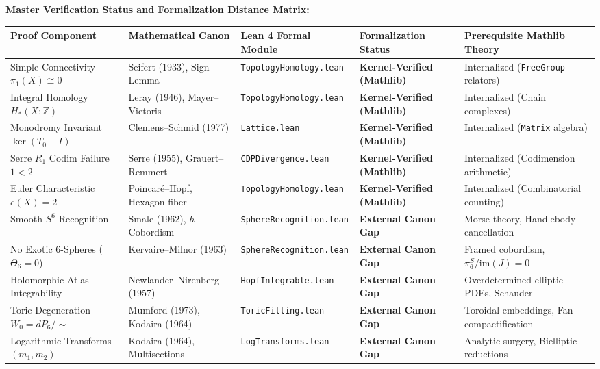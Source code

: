 \documentclass[10pt]{article}
\newcommand{\dbZ}{\mathbb{Z}}
\begin{document}
\vspace{0.4em}
\noindent\textbf{Master Verification Status and Formalization Distance Matrix:}
\begin{center}
\small
\begin{tabular*}{\textwidth}{@{\extracolsep{\fill}}lllll@{}}
\toprule
\textbf{Proof Component} & \textbf{Mathematical Canon} & \textbf{Lean 4 Formal Module} & \textbf{Formalization Status} & \textbf{Prerequisite Mathlib Theory} \\
\midrule
Simple Connectivity $\pi_1(X) \cong 0$ & Seifert (1933), Sign Lemma & \texttt{TopologyHomology.lean} & \textbf{Kernel-Verified (Mathlib)} & Internalized (\texttt{FreeGroup} relators) \\
Integral Homology $H_*(X;\dbZ)$ & Leray (1946), Mayer--Vietoris & \texttt{TopologyHomology.lean} & \textbf{Kernel-Verified (Mathlib)} & Internalized (Chain complexes) \\
Monodromy Invariant $\ker(T_0 - I)$ & Clemens--Schmid (1977) & \texttt{Lattice.lean} & \textbf{Kernel-Verified (Mathlib)} & Internalized (\texttt{Matrix} algebra) \\
Serre $R_1$ Codim Failure $1 < 2$ & Serre (1955), Grauert--Remmert & \texttt{CDPDivergence.lean} & \textbf{Kernel-Verified (Mathlib)} & Internalized (Codimension arithmetic) \\
Euler Characteristic $e(X) = 2$ & Poincaré--Hopf, Hexagon fiber & \texttt{TopologyHomology.lean} & \textbf{Kernel-Verified (Mathlib)} & Internalized (Combinatorial counting) \\
\addlinespace
Smooth $S^6$ Recognition & Smale (1962), $h$-Cobordism & \texttt{SphereRecognition.lean} & \textbf{External Canon Gap} & Morse theory, Handlebody cancellation \\
No Exotic 6-Spheres ($\Theta_6 = 0$) & Kervaire--Milnor (1963) & \texttt{SphereRecognition.lean} & \textbf{External Canon Gap} & Framed cobordism, $\pi_6^S / \mathrm{im}(J) = 0$ \\
Holomorphic Atlas Integrability & Newlander--Nirenberg (1957) & \texttt{HopfIntegrable.lean} & \textbf{External Canon Gap} & Overdetermined elliptic PDEs, Schauder \\
Toric Degeneration $W_0 = dP_6/\sim$ & Mumford (1973), Kodaira (1964) & \texttt{ToricFilling.lean} & \textbf{External Canon Gap} & Toroidal embeddings, Fan compactification \\
Logarithmic Transforms $(m_1, m_2)$ & Kodaira (1964), Multisections & \texttt{LogTransforms.lean} & \textbf{External Canon Gap} & Analytic surgery, Bielliptic reductions \\
\bottomrule
\end{tabular*}
\end{center}
\end{document}

